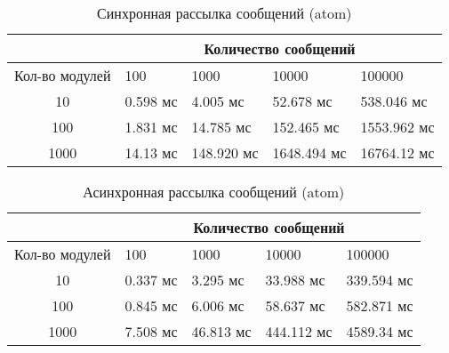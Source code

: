 \begin{table}[!htbp]
    \caption{\label{tab:atom_rrc_old}Синхронная рассылка сообщений (atom)}
    \begin{center}
        \begin{tabularx}{\textwidth}{|c|X|X|X|X|}
            \hline
            & \multicolumn{4}{|c|}{Количество сообщений} \\
            \hline
            Кол-во модулей & 100   & 1000   & 10000   & 100000   \\
            \hline
            10             & 0.598 мс  & 4.005 мс   & 52.678 мс   & 538.046 мс   \\
            \hline
            100            & 1.831 мс  & 14.785 мс  & 152.465 мс  & 1553.962 мс  \\
            \hline
            1000           & 14.13 мс & 148.920 мс & 1648.494 мс & 16764.12  мс \\
            \hline
        \end{tabularx}
    \end{center}
\end{table}


\begin{table}[!htbp]
    \caption{\label{tab:atom_rrc}Асинхронная рассылка сообщений (atom)}
    \begin{center}
        \begin{tabularx}{\textwidth}{|c|X|X|X|X|}
            \hline
            & \multicolumn{4}{|c|}{Количество сообщений} \\
            \hline
            Кол-во модулей & 100   & 1000   & 10000   & 100000   \\
            \hline
            10             & 0.337 мс  & 3.295 мс   & 33.988 мс   & 339.594 мс   \\
            \hline
            100            & 0.845 мс  & 6.006 мс  & 58.637 мс  & 582.871 мс  \\
            \hline
            1000           & 7.508 мс & 46.813 мс & 444.112 мс & 4589.34  мс \\
            \hline
        \end{tabularx}
    \end{center}
\end{table}



